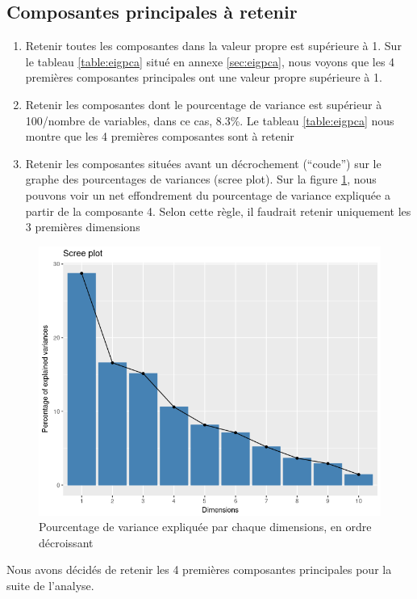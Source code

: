 \documentclass[11pt,a4paper]{article}
\begin{document}
\subsection{Composantes principales à retenir}
\begin{enumerate}
	\item Retenir toutes les composantes dans la valeur propre est supérieure à 1. Sur le tableau \ref{table:eigpca} situé en annexe \ref{sec:eigpca}, nous voyons que les 4 premières composantes principales ont une valeur propre supérieure à 1.
	\item Retenir les composantes dont le pourcentage de variance est supérieur à 100/nombre de variables, dans ce cas, 8.3\%. Le tableau \ref{table:eigpca} nous montre que les 4 premières composantes sont à retenir
	\item Retenir les composantes situées avant un décrochement (``coude'') sur le graphe des pourcentages de variances (scree plot). Sur la figure  \ref{fig:screepca}, nous pouvons voir un net effondrement du pourcentage de variance expliquée a partir de la composante 4. Selon cette règle, il faudrait retenir uniquement les 3 premières dimensions
\end{enumerate}
\begin{figure}
	\centering
	\includegraphics[scale=0.6]{"screeplotpca"}
	\caption{Pourcentage de variance expliquée par chaque dimensions, en ordre décroissant}
	\label{fig:screepca}
\end{figure}

Nous avons décidés de retenir les 4 premières composantes principales pour la suite de l'analyse.
\end{document}
